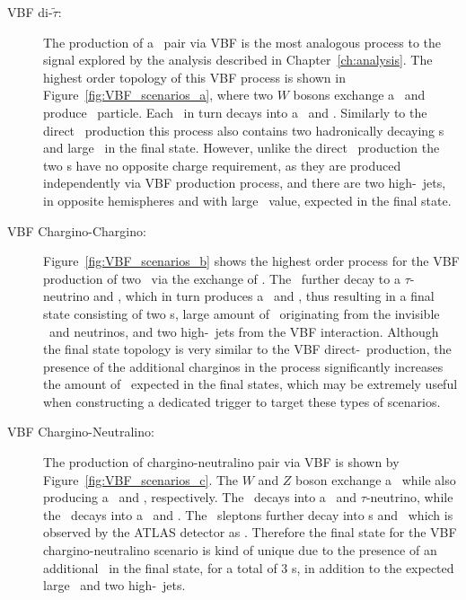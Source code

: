 	 \begin{description}
	 \item[\ac{VBF} di-$\tilde{\tau}$:] The production of a \stau\ pair via \ac{VBF} is the most analogous process to the signal explored by the analysis described in Chapter~\ref{ch:analysis}. 
	 The highest order topology of this \ac{VBF} process is shown in Figure~\ref{fig:VBF_scenarios_a}, where two $W$ bosons exchange a \ninotwo\ and produce \stau\ particle. Each \stau\ in turn decays into a \ltau\ and \ninoone . 
	 Similarly to the direct \stau\ production this process also contains two hadronically decaying \ltau s and large \met\ in the final state. 
	 However, unlike the direct \stau\ production the two \ltau s have no opposite charge requirement, as they are produced independently via \ac{VBF} production process, and there are two high-\pt\ jets, in opposite hemispheres and with large \mjj\ value, expected in the final state.	 
	 
	 \item[\ac{VBF} Chargino-Chargino:] Figure~\ref{fig:VBF_scenarios_b} shows the highest order process for the \ac{VBF} production of two \chinoonepm\ via the exchange of \ninotwo. 
	 The \chinoonepm\ further decay to a $\tau$-neutrino and \stau, which in turn produces a \ltau\ and \ninoone, thus resulting in a final state consisting of two \ltau s, large amount of \met\ originating from the invisible \ninoone\ and neutrinos, and two high-\pt\ jets from the \ac{VBF} interaction.
	 Although the final state topology is very similar to the \ac{VBF} direct-\stau\ production, the presence of the additional charginos in the process significantly increases the amount of \met\ expected in the final states, which may be extremely useful when constructing a dedicated trigger to target these types of scenarios.
	 
	 \item[\ac{VBF} Chargino-Neutralino:] The production of chargino-neutralino pair via \ac{VBF} is shown by Figure~\ref{fig:VBF_scenarios_c}. The $W$ and $Z$ boson exchange a \ninotwo\ while also producing a \chinoonepm\ and \ninotwo, respectively. The \chinoonepm\ decays into a \stau\ and $\tau$-neutrino, while the \ninotwo\ decays into a \stau\ and \ltau. The \stau\ sleptons further decay into \ltau s and \ninoone\ which is observed by the \ac{ATLAS} detector as \met. Therefore the final state for the \ac{VBF} chargino-neutralino scenario is kind of unique due to the presence of an additional \ltau\ in the final state, for a total of 3 \ltau s, in addition to the expected large \met\ and two high-\pt\ jets. 
	 \end{description}
	 
